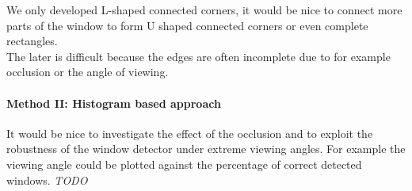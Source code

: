 We only developed L-shaped connected corners, it would be nice to connect more
parts of the window to form U shaped connected corners or even complete rectangles.\\
The later is difficult because the edges are often incomplete due to for example occlusion 
or the angle of viewing.


\paragraph{Method II: Histogram based approach} 
It would be nice to investigate the effect of the occlusion and to exploit the
robustness of the window detector under extreme viewing angles.
For example the viewing angle could be plotted against the percentage of
correct detected windows.
\emph{TODO}





% 
% 
% 
% 
% 
% 
% 
% 
